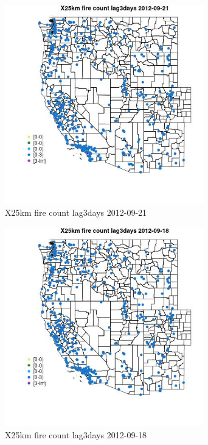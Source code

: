 \begin{figure} 
\centering  
\includegraphics[width=0.77\textwidth]{Code_Outputs/Report_ML_input_PM25_Step4_part_e_de_duplicated_aves_compiled_2019-05-14wNAs_MapObsX25km_fire_count_lag3days2012-09-21.jpg} 
\caption{\label{fig:Report_ML_input_PM25_Step4_part_e_de_duplicated_aves_compiled_2019-05-14wNAsMapObsX25km_fire_count_lag3days2012-09-21}X25km fire count lag3days 2012-09-21} 
\end{figure} 
 

\begin{figure} 
\centering  
\includegraphics[width=0.77\textwidth]{Code_Outputs/Report_ML_input_PM25_Step4_part_e_de_duplicated_aves_compiled_2019-05-14wNAs_MapObsX25km_fire_count_lag3days2012-09-18.jpg} 
\caption{\label{fig:Report_ML_input_PM25_Step4_part_e_de_duplicated_aves_compiled_2019-05-14wNAsMapObsX25km_fire_count_lag3days2012-09-18}X25km fire count lag3days 2012-09-18} 
\end{figure} 
 

